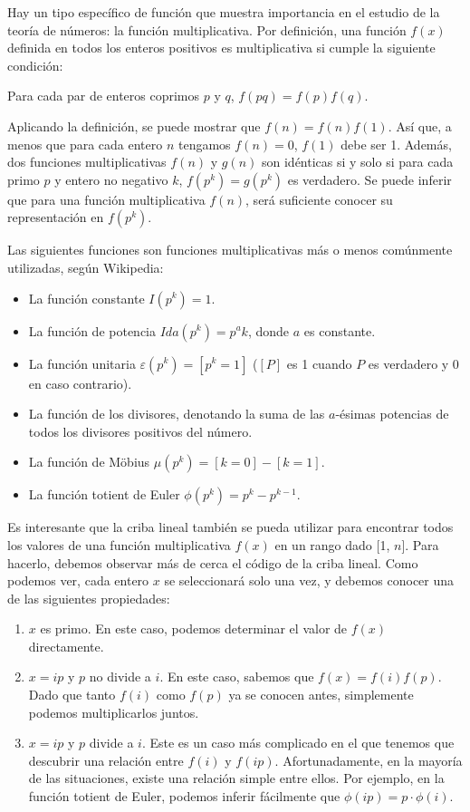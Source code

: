 \documentclass[11pt]{scrartcl}
\begin{document}
Hay un tipo específico de función que muestra importancia en el estudio de la teoría de números: la función multiplicativa. Por definición, una función \(f(x)\) definida en todos los enteros positivos es multiplicativa si cumple la siguiente condición:

Para cada par de enteros coprimos \(p\) y \(q\), \(f(pq) = f(p)f(q)\).

Aplicando la definición, se puede mostrar que \(f(n) = f(n)f(1)\). Así que, a menos que para cada entero \(n\) tengamos \(f(n) = 0\), \(f(1)\) debe ser 1. Además, dos funciones multiplicativas \(f(n)\) y \(g(n)\) son idénticas si y solo si para cada primo \(p\) y entero no negativo \(k\), \(f(p^k) = g(p^k)\) es verdadero. Se puede inferir que para una función multiplicativa \(f(n)\), será suficiente conocer su representación en \(f(p^k)\).

Las siguientes funciones son funciones multiplicativas más o menos comúnmente utilizadas, según Wikipedia:

\begin{itemize}
    \item La función constante \(I(p^k) = 1\).
    \item La función de potencia \(Ida(p^k) = p^ak\), donde \(a\) es constante.
    \item La función unitaria \(\varepsilon(p^k) = [p^k = 1]\) (\([P]\) es 1 cuando \(P\) es verdadero y 0 en caso contrario).
    \item La función de los divisores, denotando la suma de las \(a\)-ésimas potencias de todos los divisores positivos del número.
    \item La función de Möbius \(\mu(p^k) = [k = 0] - [k = 1]\).
    \item La función totient de Euler \(\phi(p^k) = p^k - p^{k-1}\).
\end{itemize}

Es interesante que la criba lineal también se pueda utilizar para encontrar todos los valores de una función multiplicativa \(f(x)\) en un rango dado [1, \(n\)]. Para hacerlo, debemos observar más de cerca el código de la criba lineal. Como podemos ver, cada entero \(x\) se seleccionará solo una vez, y debemos conocer una de las siguientes propiedades:

\begin{enumerate}
    \item \(x\) es primo. En este caso, podemos determinar el valor de \(f(x)\) directamente.
    \item \(x = ip\) y \(p\) no divide a \(i\). En este caso, sabemos que \(f(x) = f(i)f(p)\). Dado que tanto \(f(i)\) como \(f(p)\) ya se conocen antes, simplemente podemos multiplicarlos juntos.
    \item \(x = ip\) y \(p\) divide a \(i\). Este es un caso más complicado en el que tenemos que descubrir una relación entre \(f(i)\) y \(f(ip)\). Afortunadamente, en la mayoría de las situaciones, existe una relación simple entre ellos. Por ejemplo, en la función totient de Euler, podemos inferir fácilmente que \(\phi(ip) = p \cdot \phi(i)\).
\end{enumerate}
\end{document}
